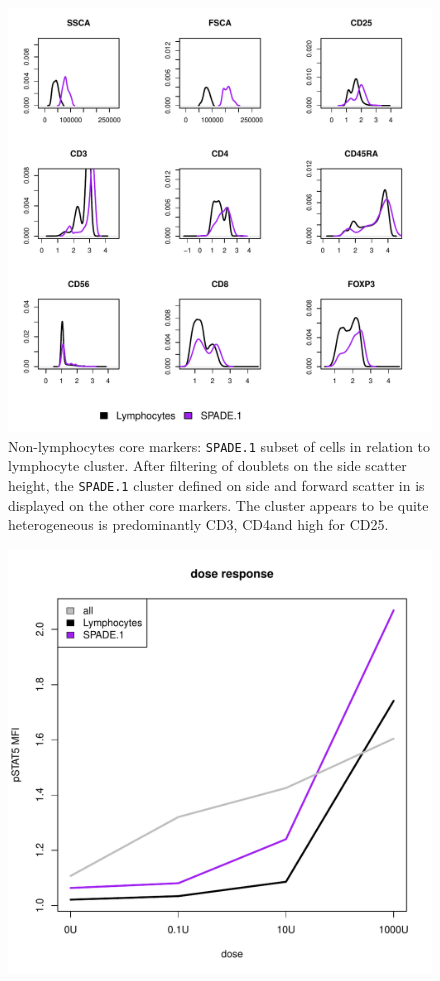 \begin{figure}
  \centering
\begin{minipage}{.9\textwidth}
\includegraphics[width=\linewidth]{figures/spade-nonlymphocytes-clusters}
{ Non-lymphocytes core markers: \texttt{SPADE.1} subset of cells in relation to lymphocyte cluster.  }
{
After filtering of doublets on the side scatter height, the \texttt{SPADE.1} cluster defined on side and forward scatter in  is displayed on the other core markers.
The cluster appears to be quite heterogeneous is predominantly CD3\positive, CD4\positive and high for CD25.
} 
\end{minipage}
%
\begin{minipage}{.5\textwidth}
  \includegraphics[width=\linewidth]{figures/spade-nonlymphocytes-dose-response}

\end{minipage}
\end{figure}
